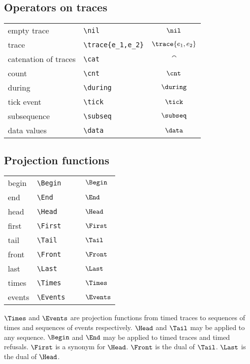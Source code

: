 \documentclass[12pt]{article}
\begin{document}
\subsection{Operators on traces}

\begin{tabular}{p{1.95in}p{1.75in}c} \\
empty trace     & \verb|\nil|           & $\nil $ \\[0.6ex]
trace   & \verb|\trace{e_1,e_2}|        & $\trace{e_1,e_2}$\\[0.6ex]
catenation of traces & \verb|\cat|      & $\cat $ \\[0.6ex]
count           & \verb|\cnt|           & $\cnt $ \\[0.6ex]
during          & \verb|\during|        & $\during $ \\[0.6ex]
tick event      & \verb|\tick|          & $\tick$ \\[0.6ex]
subsequence     & \verb|\subseq|        & $\subseq$ \\[0.6ex]
data values     & \verb|\data|          & $\data$ 
\end{tabular}

\subsection{Projection functions}

\begin{tabular}{p{1.95in}p{1.75in}l} \\
  begin         & \verb|\Begin    |  & $\Begin$   \\[0.4ex]
  end           & \verb|\End      |  & $\End  $   \\[0.4ex]
  head          & \verb|\Head     |  & $\Head $   \\[0.4ex]
  first         & \verb|\First    |  & $\First$   \\[0.4ex]
  tail          & \verb|\Tail     |  & $\Tail $   \\[0.4ex]
  front         & \verb|\Front    |  & $\Front$   \\[0.4ex]
  last          & \verb|\Last     |  & $\Last $   \\[0.4ex]
  times         & \verb|\Times    |  & $\Times$   \\[0.4ex]
  events        & \verb|\Events   |  & $\Events$  \\[0.4ex]
\end{tabular}

$\Times$ and $\Events$ are projection functions from timed traces to
sequences of times and sequences of events respectively.  $\Head$ and
$\Tail$ may be applied to any sequence.  $\Begin$ and $\End$ may be
applied to timed traces and timed refusals.  $\First$ is a synonym for
$\Head$. $\Front$ is the dual of $\Tail$.  $\Last$ is the dual of
$\Head$.
\end{document}

